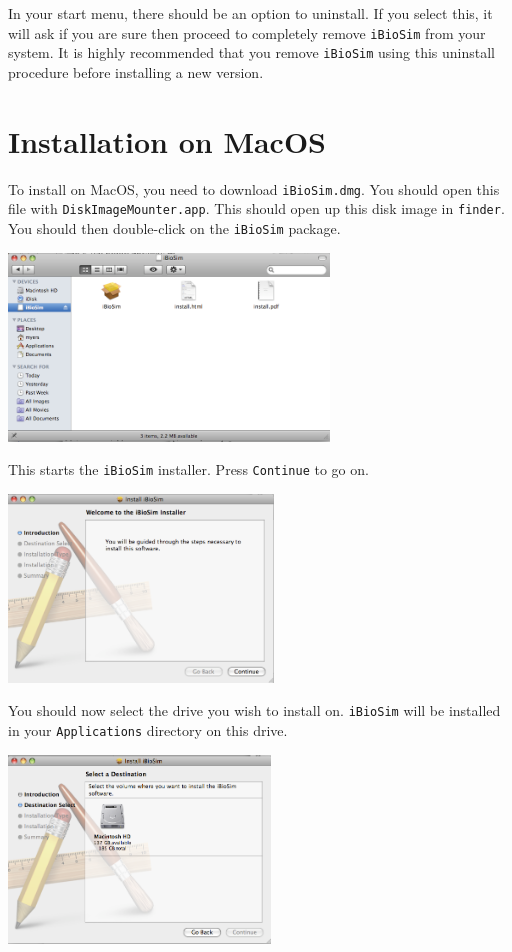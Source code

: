 \documentclass[titlepage,11pt]{article}
\begin{document}
In your start menu, there should be an option to uninstall.  If you
select this, it will ask if you are sure then proceed to completely
remove {\tt iBioSim} from your system.  It is highly recommended that
you remove {\tt iBioSim} using this uninstall procedure before
installing a new version.

\section{Installation on MacOS}

\noindent
To install on MacOS, you need to download {\tt iBioSim.dmg}.  You should
open this file with {\tt DiskImageMounter.app}.  This should open up
this disk image in {\tt finder}.  You should then
double-click on the {\tt iBioSim} package.  

\includegraphics[height=50mm]{screenshots/finder}

This starts the {\tt iBioSim} installer.  Press {\tt Continue} to go on.

\includegraphics[height=50mm]{screenshots/intro}

You should now select the drive you wish to install on.  {\tt iBioSim}
will be installed in your {\tt Applications} directory on this drive.

\includegraphics[height=50mm]{screenshots/destination}
\end{document}
